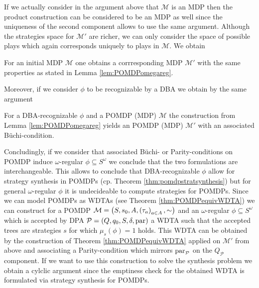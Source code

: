 If we actually consider in the argument above that $\mathcal{M}$ is an \ac{MDP} 
then the product construction can be considered to be an \ac{MDP} as well since 
the uniqueness of the second component allows to use the same argument. 
Although the strategies space for $\mathcal{M'}$ are richer, we can only 
consider the space of possible plays which again corresponds uniquely to plays 
in $\mathcal{M}$. We obtain
\begin{corollary}
  For an initial \ac{MDP} $\mathcal{M}$ one obtains a corrresponding \ac{MDP} 
  $\mathcal{M}'$ with the same properties as stated in Lemma 
  \ref{lem:POMDPomegareg}.
\end{corollary}
Moreover, if we consider $\phi$ to be recognizable by a \ac{DBA} we obtain by
the same argument
\begin{corollary}
  For a \ac{DBA}-recognizable $\phi$ and a \ac{POMDP} (\ac{MDP}) $\mathcal{M}$
  the construction from Lemma \ref{lem:POMDPomegareg} yields an \ac{POMDP} 
  (\ac{MDP}) $\mathcal{M'}$ with an associated Büchi-condition.
  \label{cor:POMDPDBA}
\end{corollary}
Concludingly, if we consider that associated Büchi- or Parity-conditions on
\ac{POMDP} induce $\omega$-regular $\phi\subseteq S^{\omega}$ we conclude that
the two formulations are interchangeable. This allows to conclude that 
\ac{DBA}-recognizable $\phi$ allow for strategy synthesis in \acp{POMDP} (cp.
Theorem \ref{thm:pomdpstratsynthesis}) but for general $\omega$-regular $\phi$ 
it is undecideable to compute strategies for \acp{POMDP}. Since we can model 
\acp{POMDP} as \acp{WDTA} (see Theorem \ref{thm:POMDPequivWDTA}) we can 
construct for a \ac{POMDP} 
$\mathcal{M} = \left(S, s_{0}, A, \left(\tau_{a}\right)_{a\in A}, \sim\right)$ and an 
$\omega$-regular $\phi\subseteq S^{\omega}$ which is accepted by \ac{DPA}
$\mathcal{P} = \left(Q, q_{0}, S, \delta, \operatorname{par}\right)$ a \ac{WDTA} such that the
accepted trees are strategies $s$ for which $\mu_{s}(\phi) = 1$ holds. This
\ac{WDTA} can be obtained by the construction of Theorem 
\ref{thm:POMDPequivWDTA} applied on $\mathcal{M'}$ from above and associating a 
Parity-condition which mirrors $\operatorname{par}_{\mathcal{P}}$ on the $Q_{\mathcal{P}}$
component. If we want to use this construction to solve the synthesis problem 
we obtain a cylclic argument since the emptiness check for the obtained 
\ac{WDTA} is formulated via strategy synthesis for \acp{POMDP}.

